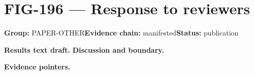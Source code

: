 \clearpage
\section{FIG-196 --- Response to reviewers}
\label{figpage:fig-196}
\textbf{Group:} PAPER-OTHER\quad \textbf{Evidence chain:} manifested\quad \textbf{Status:} publication

\textbf{Results text draft.} 
\textbf{Discussion and boundary.} 


\textbf{Evidence pointers.}



\vfill
